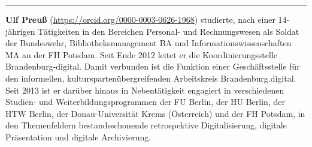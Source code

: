 \begin{center}\rule{0.5\linewidth}{0.5pt}\end{center}

\textbf{Ulf Preuß} (\url{https://orcid.org/0000-0003-0626-1968}) studierte, nach einer
14-jährigen Tätigkeiten in den Bereichen Personal- und Rechnungswesen
als Soldat der Bundeswehr, Bibliotheksmanagement BA und
Informationswissenschaften MA an der FH Potsdam. Seit Ende 2012 leitet
er die Koordinierungsstelle Brandenburg-digital. Damit verbunden ist die
Funktion einer Geschäftsstelle für den informellen,
kulturspartenübergreifenden Arbeitskreis Brandenburg.digital. Seit 2013
ist er darüber hinaus in Nebentätigkeit engagiert in verschiedenen
Studien- und Weiterbildungsprogrammen der FU Berlin, der HU Berlin, der
HTW Berlin, der Donau-Universität Krems (Österreich) und der FH Potsdam,
in den Themenfeldern bestandsschonende retrospektive Digitalisierung,
digitale Präsentation und digitale Archivierung.
